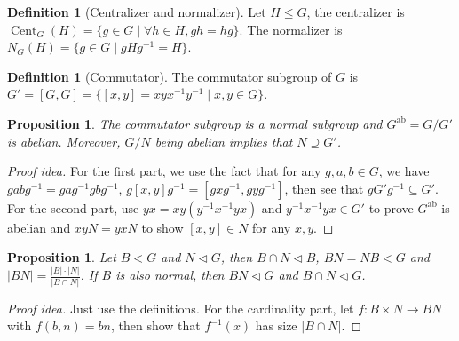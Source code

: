 \documentclass[paper=a4, fontsize=12pt]{scrartcl} %
\newtheorem{prop}[thm]{Proposition}
\theoremstyle{definition}
\newtheorem{defn}[thm]{Definition}
\theoremstyle{remark}
\DeclareMathOperator{\cent}{Cent}
\numberwithin{equation}{section} %
\numberwithin{figure}{section} %
\numberwithin{table}{section} %
\begin{document}
\begin{defn}[Centralizer and normalizer]
	Let $H \leq G$, the centralizer is $\cent_G(H) = \{g \in G \mid \forall h \in H, gh = hg\}$. The normalizer is $N_G(H) = \{g \in G \mid gHg^{-1} = H\}$.
\end{defn}
\begin{defn}[Commutator]
	The commutator subgroup of $G$ is $G' = [G,G] = \{[x,y] = xyx^{-1}y^{-1} \mid x,y \in G\}$.
\end{defn}
\begin{prop}
	The commutator subgroup is a normal subgroup and $G^{\text{ab}} = G/G'$ is  abelian. Moreover, $G/N$ being abelian implies that $N \supseteq G'$.
\end{prop}
\begin{proof}[Proof idea]
	For the first part, we use the fact that for any $g,a,b \in G$, we have $gabg^{-1} = gag^{-1}gbg^{-1}$, $g[x,y]g^{-1} = [gxg^{-1},gyg^{-1}]$, then see that $gG'g^{-1} \subseteq G'$. For the second part, use $yx = xy(y^{-1}x^{-1}yx)$ and $y^{-1}x^{-1}yx \in G'$ to prove $G^{\text{ab}}$ is abelian and $xyN = yxN$ to show $[x,y] \in N$ for any $x,y$.
\end{proof}
\begin{prop}
	Let $B < G$ and $N \lhd G$, then $B \cap N \lhd B$, $BN = NB < G$ and $|BN| = \frac{|B| \cdot |N|}{|B \cap N|}$. If $B$ is also normal, then $BN \lhd G$ and $B \cap N \lhd G$.
\end{prop}
\begin{proof}[Proof idea]
	Just use the definitions. For the cardinality part, let $f: B \times N \rightarrow BN$ with $f(b,n) = bn$, then show that $f^{-1}(x)$ has size $|B \cap N|$.
\end{proof}
\end{document}
